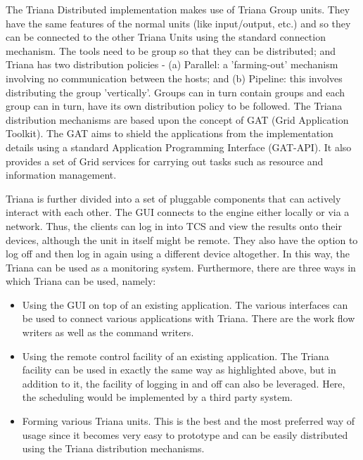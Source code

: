 \documentclass[9pt,twocolumn,twoside]{styles/osajnl}
\begin{document}
The Triana Distributed implementation makes use of Triana Group units.
They have the same features of the normal units (like input/output,
etc.) and so they can be connected to the other Triana Units using the
standard connection mechanism.  The tools need to be group so that
they can be distributed; and Triana has two distribution policies -
(a) Parallel: a 'farming-out' mechanism involving no communication between
the hosts; and (b) Pipeline: this involves distributing the group
'vertically'.  Groups can in turn contain groups and each group can in
turn, have its own distribution policy to be followed.  The Triana
distribution mechanisms are based upon the concept of GAT (Grid
Application Toolkit).  The GAT aims to shield the applications from
the implementation details using a standard Application Programming
Interface (GAT-API).  It also provides a set of Grid services for
carrying out tasks such as resource and information management.

Triana is further divided into a set of pluggable components that can 
actively interact with each other. The GUI connects to the engine either 
locally or via a network. Thus, the clients can log in into TCS and view 
the results onto their devices, although the unit in itself might be 
remote. They also have the option to log off and then log in again using 
a different device altogether. In this way, the Triana can be used as a 
monitoring system. Furthermore, there are three ways in which Triana can 
be used, namely: 

\begin{itemize} 

\item Using the GUI on top of an existing application. The various 
interfaces can be used to connect various applications with Triana. 
There are the work flow writers as well as the command writers. 

\item Using the remote control facility of an existing application. The 
Triana facility can be used in exactly the same way as highlighted 
above, but in addition to it, the facility of logging in and off can 
also be leveraged. Here, the scheduling would be implemented by a third 
party system. 

\item Forming various Triana units. This is the best and the most 
preferred way of usage since it becomes very easy to prototype and can 
be easily distributed using the Triana distribution mechanisms. 

\end{itemize} 
\end{document}
